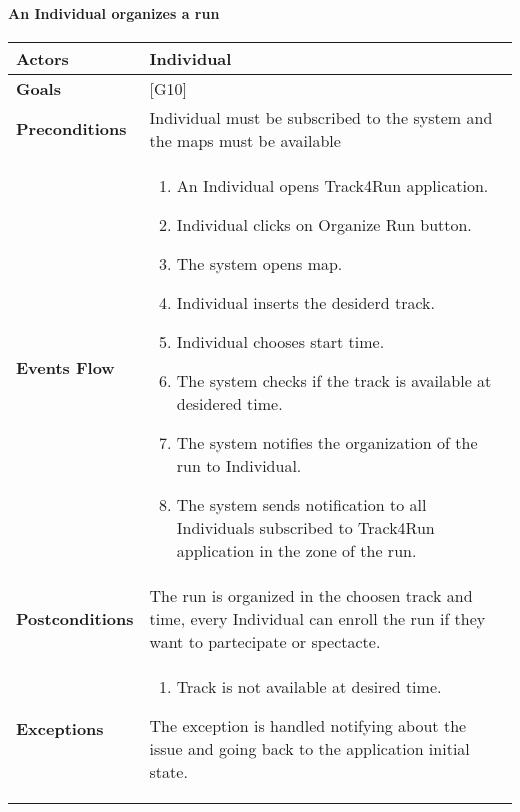 \documentclass[12pt]{article}
\begin{document}
\newpage
\paragraph{An Individual organizes a run} 
\begin{center}
    \begin{tabular} { |p{}|p{}| }
         \hline
         \textbf{Actors} & Individual \\ 
         \hline
         \textbf{Goals} & {[G10]} \\ 
         \hline  
         \textbf{Preconditions} & Individual must be subscribed to the system and the maps must be available \\ 
         \hline
         \textbf{Events Flow} & \begin{enumerate}[topsep=0pt]
             \setlength{\itemsep}{0.5pt}
             \item An Individual opens Track4Run application. 
             \item Individual clicks on Organize Run button. 
             \item The system opens map.
             \item Individual inserts the desiderd track. 
             \item Individual chooses start time.
             \item The system checks if the track is available at desidered time. 
             \item The system notifies the organization of the run to Individual. 
             \item The system sends notification to all Individuals subscribed to Track4Run application in the zone of the run. 
             \end{enumerate} \\ 
        \hline
        \textbf{Postconditions} & The run is organized in the choosen track and time, every Individual can enroll the run if they want to partecipate or spectacte. \\ 
        \hline 
         \textbf{Exceptions} & \begin{enumerate}[topsep=0pt] 
              \setlength{\itemsep}{0.5pt}
              \item Track is not available at desired time. 
              \end{enumerate} 
            The exception is handled notifying about the issue and going back to the application initial state. \\ 
            \hline
    \end{tabular}
\end{center}
            
\end{document}
